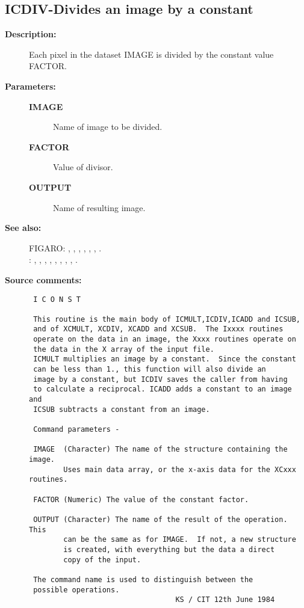 \subsection{ICDIV-\label{ICDIV}Divides an image by a constant}
\begin{description}

\item [{\bf Description:}]
 Each pixel in the dataset IMAGE is divided by the
 constant value FACTOR.

\item [{\bf Parameters:}]
\begin{description}
\item [{\bf IMAGE}]
 Name of image to be divided.
\item [{\bf FACTOR}]
 Value of divisor.
\item [{\bf OUTPUT}]
 Name of resulting image.
\end{description}

\item [{\bf See also:}]
FIGARO: , , , , , , .\\
: , , , , , , , , .\\

\item [{\bf Source comments:}]
\begin{verbatim}
 I C O N S T

 This routine is the main body of ICMULT,ICDIV,ICADD and ICSUB,
 and of XCMULT, XCDIV, XCADD and XCSUB.  The Ixxxx routines
 operate on the data in an image, the Xxxx routines operate on
 the data in the X array of the input file.
 ICMULT multiplies an image by a constant.  Since the constant
 can be less than 1., this function will also divide an
 image by a constant, but ICDIV saves the caller from having
 to calculate a reciprocal. ICADD adds a constant to an image and
 ICSUB subtracts a constant from an image.

 Command parameters -

 IMAGE  (Character) The name of the structure containing the image.
        Uses main data array, or the x-axis data for the XCxxx routines.

 FACTOR (Numeric) The value of the constant factor.

 OUTPUT (Character) The name of the result of the operation.  This
        can be the same as for IMAGE.  If not, a new structure
        is created, with everything but the data a direct
        copy of the input.

 The command name is used to distinguish between the
 possible operations.
                                  KS / CIT 12th June 1984
\end{verbatim}
\end{description}
